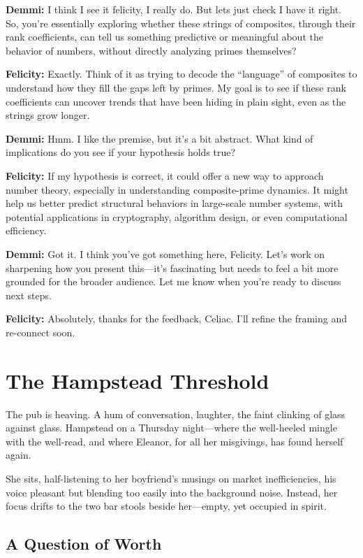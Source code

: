 \noindent\textbf{Demmi:} I think I see it felicity, I really do. But lets just check I have it right. So, you’re essentially exploring whether these strings of composites, through their rank coefficients, can tell us something predictive or meaningful about the behavior of numbers, without directly analyzing primes themselves?

\noindent\textbf{Felicity:} Exactly. Think of it as trying to decode the ``language'' of composites to understand how they fill the gaps left by primes. My goal is to see if these rank coefficients can uncover trends that have been hiding in plain sight, even as the strings grow longer.

\noindent\textbf{Demmi:} Hmm. I like the premise, but it’s a bit abstract. What kind of implications do you see if your hypothesis holds true?

\noindent\textbf{Felicity:} If my hypothesis is correct, it could offer a new way to approach number theory, especially in understanding composite-prime dynamics. It might help us better predict structural behaviors in large-scale number systems, with potential applications in cryptography, algorithm design, or even computational efficiency.

\noindent\textbf{Demmi:} Got it. I think you’ve got something here, Felicity. Let’s work on sharpening how you present this—it’s fascinating but needs to feel a bit more grounded for the broader audience. Let me know when you’re ready to discuss next steps.

\noindent\textbf{Felicity:} Absolutely, thanks for the feedback, Celiac. I’ll refine the framing and re-connect soon.

\newpage

\section*{The Hampstead Threshold}

The pub is heaving. A hum of conversation, laughter, the faint clinking of glass against glass. Hampstead on a Thursday night—where the well-heeled mingle with the well-read, and where Eleanor, for all her misgivings, has found herself again. 

She sits, half-listening to her boyfriend’s musings on market inefficiencies, his voice pleasant but blending too easily into the background noise. Instead, her focus drifts to the two bar stools beside her—empty, yet occupied in spirit.

\subsection*{A Question of Worth}

